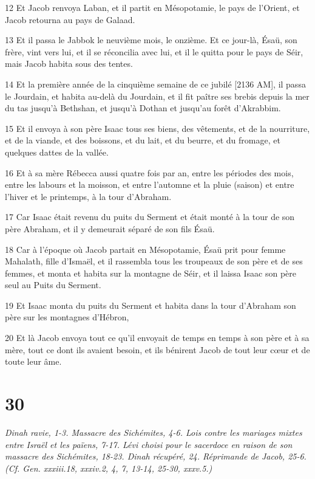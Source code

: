 \par 12 Et Jacob renvoya Laban, et il partit en Mésopotamie, le pays de l'Orient, et Jacob retourna au pays de Galaad.
\par 13 Et il passa le Jabbok le neuvième mois, le onzième. Et ce jour-là, Ésaü, son frère, vint vers lui, et il se réconcilia avec lui, et il le quitta pour le pays de Séir, mais Jacob habita sous des tentes.
\par 14 Et la première année de la cinquième semaine de ce jubilé [2136 AM], il passa le Jourdain, et habita au-delà du Jourdain, et il fit paître ses brebis depuis la mer du tas jusqu'à Bethshan, et jusqu'à Dothan et jusqu'au forêt d'Akrabbim.
\par 15 Et il envoya à son père Isaac tous ses biens, des vêtements, et de la nourriture, et de la viande, et des boissons, et du lait, et du beurre, et du fromage, et quelques dattes de la vallée.
\par 16 Et à sa mère Rébecca aussi quatre fois par an, entre les périodes des mois, entre les labours et la moisson, et entre l'automne et la pluie (saison) et entre l'hiver et le printemps, à la tour d'Abraham.
\par 17 Car Isaac était revenu du puits du Serment et était monté à la tour de son père Abraham, et il y demeurait séparé de son fils Ésaü.
\par 18 Car à l'époque où Jacob partait en Mésopotamie, Ésaü prit pour femme Mahalath, fille d'Ismaël, et il rassembla tous les troupeaux de son père et de ses femmes, et monta et habita sur la montagne de Séir, et il laissa Isaac son père seul au Puits du Serment.
\par 19 Et Isaac monta du puits du Serment et habita dans la tour d'Abraham son père sur les montagnes d'Hébron,
\par 20 Et là Jacob envoya tout ce qu'il envoyait de temps en temps à son père et à sa mère, tout ce dont ils avaient besoin, et ils bénirent Jacob de tout leur cœur et de toute leur âme.

\chapter{30}

\par \textit{Dinah ravie, 1-3. Massacre des Sichémites, 4-6. Lois contre les mariages mixtes entre Israël et les païens, 7-17. Lévi choisi pour le sacerdoce en raison de son massacre des Sichémites, 18-23. Dinah récupéré, 24. Réprimande de Jacob, 25-6. (Cf. Gen. xxxiii.18, xxxiv.2, 4, 7, 13-14, 25-30, xxxv.5.)}

